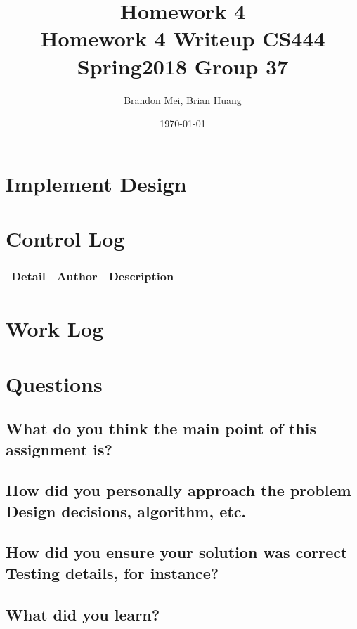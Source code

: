 \documentclass[onecolumn, draftclsnofoot, 10pt, titlepage, compsoc]{IEEEtran}
\title
{%
	Homework 4 \\
	\vspace{0.4cm}
	\large Homework 4 Writeup
	\vspace{0.4cm}
	\large CS444 Spring2018 Group 37
}
\author{Brandon Mei, Brian Huang}
\date{\today}
\begin{document}
\maketitle

\newpage

\section{Implement Design}

\section{Control Log}

\begin{tabular}{l p{5cm} l p{5cm} l}
\textbf{Detail} & \textbf{Author} & \textbf{Description}\\

\end{tabular}

\section{Work Log}

\begin{itemize}

\end{itemize}

\section{Questions}

\subsection{What do you think the main point of this assignment is?}

\subsection{How did you personally approach the problem Design decisions, algorithm, etc.}

\subsection{How did you ensure your solution was correct Testing details, for instance?}

\subsection{What did you learn?}

\nocite{*}


\end{document}
